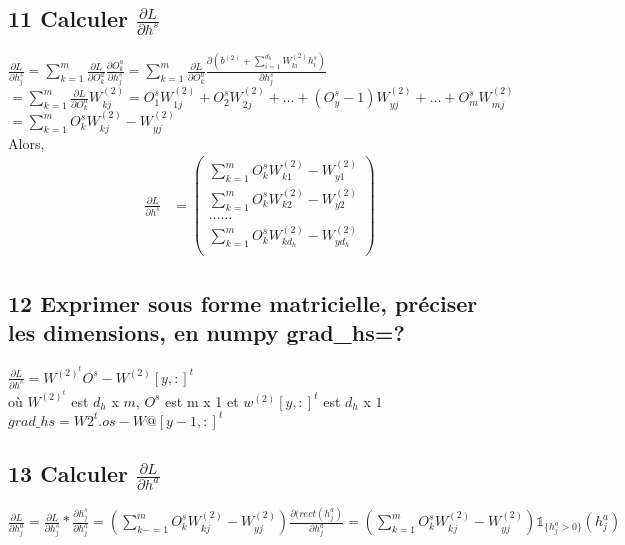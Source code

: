 \documentclass[12pt]{article}
\begin{document}
 \subsection{11 Calculer $\frac{\partial L}{\partial h^s}$}
$ \frac{\partial L}{\partial h_j^s} = \sum_{k=1}^m \frac{\partial L}{\partial O_k^a}\frac{\partial O_k^a}{\partial h_j^s} = \sum_{k=1}^m \frac{\partial L}{\partial O_k^a}\frac{\partial (b^{(2)}+\sum_{i=1}^{d_h}W_{ki}^{(2)}h_i^s)}{\partial h_j^s}$\\
$ = \sum_{k=1}^m\frac{\partial L}{\partial O_k^a}W_{kj}^{(2)} =  O_1^sW_{1j}^{(2)}+O_2^sW_{2j}^{(2)}+\dots+(O_y^s-1)W_{yj}^{(2)}+\dots+O_m^sW_{mj}^{(2)}$\\

$=\sum_{k=1}^mO_k^sW_{kj}^{(2)}-W_{yj}^{(2)}$\\
Alors,\\

\begin{align*} 
\frac{\partial L}{\partial h^s}&= 
	\left(
     \begin{array}{r}
         \sum_{k=1}^m O_k^s W_{k1}^{(2)} - W_{y1}^{(2)}\\
 	\sum_{k=1}^mO_k^sW_{k2}^{(2)}-W_{y2}^{(2)}\\
        \dots  \dots\\ 
 	\sum_{k=1}^mO_k^sW_{kd_h}^{(2)}-W_{yd_h}^{(2)}\\
       \end{array}
     \right)
\end{align*}

 \subsection{12 Exprimer sous forme matricielle, préciser les dimensions, en numpy grad\_hs=?}

$\frac{\partial L}{\partial h^s} = W^{(2)^{t}}O^s-W^{(2)}[y,:]^t$\\

où $W^{(2)^t}$ est $d_h$ x $m$, $O^s$ est m x 1 et $w^{(2)}[y,:]^t$ est $d_h$ x $1$\\

$grad\_hs = W2^t.os-W@[y-1,:]^t$\\


 \subsection{13 Calculer $\frac{\partial L}{\partial h^a}$}

$\frac{\partial L}{\partial h_j^a} = \frac{\partial L}{\partial h_j^s}*\frac{\partial h_j^s}{\partial h_j^a} =(\sum_{k-=1}^m O_k^s W_{kj}^{(2)} - W_{yj}^{(2)})\frac{\partial (rect(h_j^a)}{\partial h_j^a} =  (\sum_{k=1}^m O_k^s W_{kj}^{(2)}-W_{yj}^{(2)})\mathbb{1}_{\{h_j^a > 0\}}(h_j^a)$\\
\end{document}
